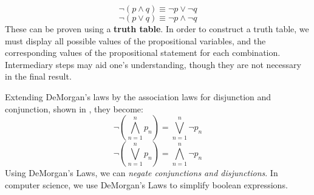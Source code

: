 \begin{equation}
  \neg (p \land q) \equiv \neg p \lor \neg q
\end{equation}
\begin{equation}
  \neg(p \lor q) \equiv \neg p \land \neg q
\end{equation}
These can be proven using a \textbf{truth table}.
In order to construct a truth table, we must display all possible values of the propositional variables,
and the corresponding values of the propositional statement for each combination.
Intermediary steps may aid one's understanding, though they are not necessary in the final result.
\begin{table}[H]
  \centering
  \caption{A proof of DeMorgan's first law.}
\end{table}
\begin{table}[H]
  \centering
  \caption{A proof of DeMorgan's second law.}
\end{table}

Extending DeMorgan's laws by the association laws for disjunction and conjunction, shown in , they become:
\begin{equation}
 \neg\left(\bigwedge^n_{n=1} p_n\right)=\bigvee^n_{n=1} \neg p_n
\end{equation}
\begin{equation}
 \neg\left(\bigvee^n_{n=1} p_n\right)=\bigwedge^n_{n=1} \neg p_n
\end{equation}
Using DeMorgan's Laws, we can \emph{negate conjunctions and disjunctions}.
In computer science, we use DeMorgan's Laws to simplify boolean expressions.

